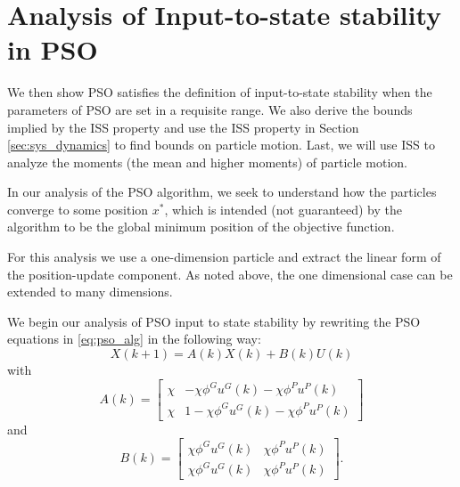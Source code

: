 \documentclass{sig-alternate}
\begin{document}
\section{Analysis of Input-to-state stability in PSO}
\label{sec:iss}

We then show PSO satisfies the definition of input-to-state stability when the parameters of PSO are set in a requisite range. 
We also derive the bounds implied by the ISS property and use the ISS property in Section \ref{sec:sys_dynamics} to find bounds on particle motion.
Last, we will use ISS to analyze the moments (the mean and higher moments) of particle motion.

In our analysis of the PSO algorithm, we seek to understand how the particles converge to some position $ x^{*} $, which is intended (not guaranteed) by the algorithm to be the global minimum position of the objective function.

For this analysis we use a one-dimension particle and extract the linear form of the position-update component.
As noted above, the one dimensional case can be extended to many dimensions.

We begin our analysis of PSO input to state stability by rewriting the PSO equations in \eqref{eq:pso_alg} in the following way:
\begin{equation}
\label{eq:pso_up_linalg_simp}
X(k+1) = A(k) X(k) + B(k) U(k)
\end{equation}
with
\begin{equation}
\nonumber
A(k) = \begin{bmatrix}
\chi & - \chi \phi^{G} u^{G}(k) - \chi \phi^{P} u^{P}(k)
\\ 
\chi & 1 - \chi \phi^{G} u^{G}(k) - \chi \phi^{P} u^{P}(k)
\end{bmatrix} 
\end{equation}
and
\begin{equation}
\nonumber
B(k) = \begin{bmatrix}
\chi \phi^{G} u^{G}(k) & \chi \phi^{P} u^{P}(k)
\\ 
\chi \phi^{G} u^{G}(k) & \chi \phi^{P} u^{P}(k)
\end{bmatrix}.
\end{equation}
\end{document}
